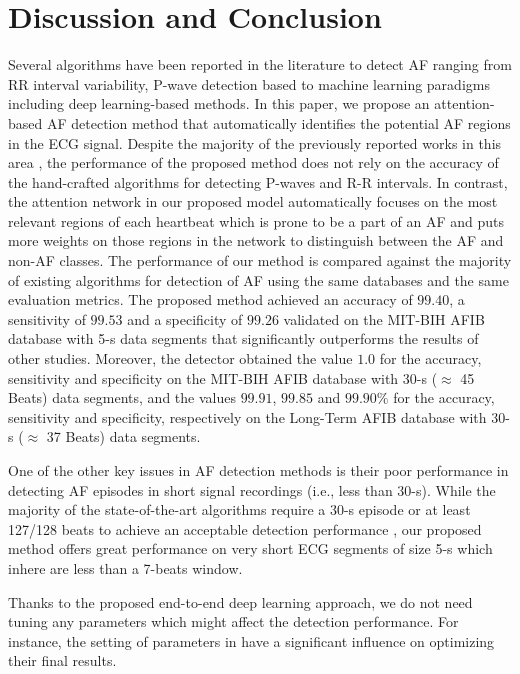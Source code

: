 \documentclass[conference]{IEEEtran}
\begin{document}
\section{Discussion and Conclusion}
\label{sec:dis_con}
Several algorithms have been reported in the literature to detect AF  ranging from RR interval variability, P-wave detection based to machine learning paradigms including deep learning-based methods. In this paper, we propose an attention-based AF detection method that automatically identifies the potential AF regions in the ECG signal.
Despite the majority of the previously reported works in this area \cite{huang2011novel,lee2013atrial,babaeizadeh2009improvements,jiang2012high}, the performance of the proposed method does not rely on the accuracy of the hand-crafted algorithms for detecting P-waves and R-R intervals. In contrast, the attention network in our proposed model automatically focuses on the most relevant regions of each heartbeat which is prone to be a part of an AF and puts more weights on those regions in the network to distinguish between the AF and non-AF classes. The performance of our method is compared against the majority of existing algorithms for detection of  AF using the same databases and the same evaluation metrics. The proposed method achieved an accuracy of $99.40$, a sensitivity of $99.53$ and a specificity of $99.26$ validated on the MIT-BIH AFIB database with 5-s data segments that significantly outperforms the results of other studies. Moreover, the detector obtained the value $1.0$ for the accuracy, sensitivity and specificity on the MIT-BIH AFIB database with 30-s ($\approx$ 45 Beats) data segments, and the values $99.91$, $99.85$ and $99.90\%$ for the accuracy, sensitivity and specificity, respectively on the Long-Term AFIB database with 30-s ($\approx$ 37 Beats) data segments.

One of the other key issues in AF detection methods is their poor performance in detecting AF episodes in short signal recordings (i.e., less than 30-s).
 While the majority of the state-of-the-art algorithms require a 30-s episode or at least 127/128 beats to achieve an acceptable detection performance \cite{cui2017automated,zhou2014automatic,huang2011novel,lee2013time}, our proposed method offers great performance on very short ECG segments of size 5-s which inhere are less than a 7-beats window. 

Thanks to the proposed end-to-end deep learning approach, we do not need tuning any parameters which might affect the detection performance. For instance, the setting of parameters in \cite{cui2017automated,petrenas2015low} have a significant influence on optimizing their final results. 
\end{document}
